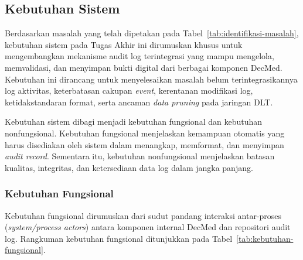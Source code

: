 %

\subsection{Kebutuhan Sistem}

Berdasarkan masalah yang telah dipetakan pada Tabel~\ref{tab:identifikasi-masalah}, kebutuhan sistem pada Tugas Akhir ini dirumuskan khusus untuk mengembangkan mekanisme audit log terintegrasi yang mampu mengelola, memvalidasi, dan menyimpan bukti digital dari berbagai komponen DecMed. Kebutuhan ini dirancang untuk menyelesaikan masalah belum terintegrasikannya log aktivitas, keterbatasan cakupan \textit{event}, kerentanan modifikasi log, ketidakstandaran format, serta ancaman \textit{data pruning} pada jaringan DLT.

Kebutuhan sistem dibagi menjadi kebutuhan fungsional dan kebutuhan nonfungsional. Kebutuhan fungsional menjelaskan kemampuan otomatis yang harus disediakan oleh sistem dalam menangkap, memformat, dan menyimpan \textit{audit record}. Sementara itu, kebutuhan nonfungsional menjelaskan batasan kualitas, integritas, dan ketersediaan data log dalam jangka panjang.

\subsubsection{Kebutuhan Fungsional}

Kebutuhan fungsional dirumuskan dari sudut pandang interaksi antar-proses (\textit{system/process actors}) antara komponen internal DecMed dan repositori audit log. Rangkuman kebutuhan fungsional ditunjukkan pada Tabel~\ref{tab:kebutuhan-fungsional}.

